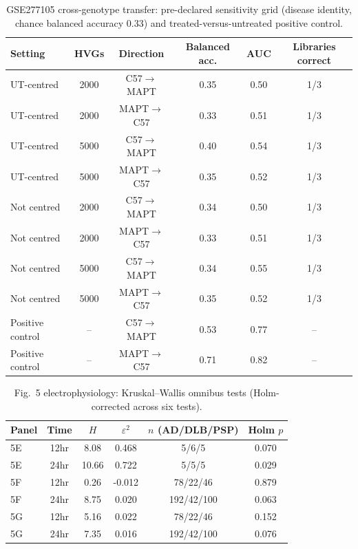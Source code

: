 \begin{table}[!htbp]
\centering\scriptsize
\caption{GSE277105 cross-genotype transfer: pre-declared sensitivity grid (disease identity, chance balanced accuracy 0.33) and treated-versus-untreated positive control.}\label{tab:s_fig7}
\begin{tabular}{lccccc}
\toprule
\textbf{Setting} & \textbf{HVGs} & \textbf{Direction} & \textbf{Balanced acc.} & \textbf{AUC} & \textbf{Libraries correct} \\
\midrule
UT-centred & 2000 & C57$\to$MAPT & 0.35 & 0.50 & 1/3 \\
UT-centred & 2000 & MAPT$\to$C57 & 0.33 & 0.51 & 1/3 \\
UT-centred & 5000 & C57$\to$MAPT & 0.40 & 0.54 & 1/3 \\
UT-centred & 5000 & MAPT$\to$C57 & 0.35 & 0.52 & 1/3 \\
Not centred & 2000 & C57$\to$MAPT & 0.34 & 0.50 & 1/3 \\
Not centred & 2000 & MAPT$\to$C57 & 0.33 & 0.51 & 1/3 \\
Not centred & 5000 & C57$\to$MAPT & 0.34 & 0.55 & 1/3 \\
Not centred & 5000 & MAPT$\to$C57 & 0.35 & 0.52 & 1/3 \\
Positive control & -- & C57$\to$MAPT & 0.53 & 0.77 & -- \\
Positive control & -- & MAPT$\to$C57 & 0.71 & 0.82 & -- \\
\bottomrule
\end{tabular}
\end{table}

\begin{table}[!htbp]
\centering\scriptsize
\caption{Fig.~5 electrophysiology: Kruskal--Wallis omnibus tests (Holm-corrected across six tests).}\label{tab:s_ephys}
\begin{tabular}{lccccc}
\toprule
\textbf{Panel} & \textbf{Time} & \textbf{$H$} & \textbf{$\varepsilon^2$} & \textbf{$n$ (AD/DLB/PSP)} & \textbf{Holm $p$} \\
\midrule
5E & 12hr & 8.08 & 0.468 & 5/6/5 & 0.070 \\
5E & 24hr & 10.66 & 0.722 & 5/5/5 & 0.029 \\
5F & 12hr & 0.26 & -0.012 & 78/22/46 & 0.879 \\
5F & 24hr & 8.75 & 0.020 & 192/42/100 & 0.063 \\
5G & 12hr & 5.16 & 0.022 & 78/22/46 & 0.152 \\
5G & 24hr & 7.35 & 0.016 & 192/42/100 & 0.076 \\
\bottomrule
\end{tabular}
\end{table}


